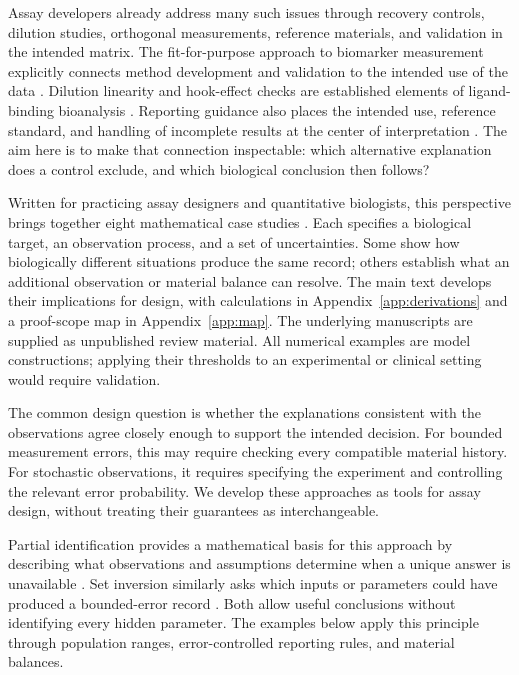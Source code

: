 \documentclass[11pt]{article}
\begin{document}
Assay developers already address many such issues through recovery controls, dilution studies, orthogonal measurements, reference materials, and validation in the intended matrix. The fit-for-purpose approach to biomarker measurement explicitly connects method development and validation to the intended use of the data \citep{lee}. Dilution linearity and hook-effect checks are established elements of ligand-binding bioanalysis \citep{ich}. Reporting guidance also places the intended use, reference standard, and handling of incomplete results at the center of interpretation \citep{stard}. The aim here is to make that connection inspectable: which alternative explanation does a control exclude, and which biological conclusion then follows?

Written for practicing assay designers and quantitative biologists, this perspective brings together eight mathematical case studies \citep{E,I,S,V,C,A,M,R}. Each specifies a biological target, an observation process, and a set of uncertainties. Some show how biologically different situations produce the same record; others establish what an additional observation or material balance can resolve. The main text develops their implications for design, with calculations in Appendix~\ref{app:derivations} and a proof-scope map in Appendix~\ref{app:map}. The underlying manuscripts are supplied as unpublished review material. All numerical examples are model constructions; applying their thresholds to an experimental or clinical setting would require validation.

The common design question is whether the explanations consistent with the observations agree closely enough to support the intended decision. For bounded measurement errors, this may require checking every compatible material history. For stochastic observations, it requires specifying the experiment and controlling the relevant error probability. We develop these approaches as tools for assay design, without treating their guarantees as interchangeable.

Partial identification provides a mathematical basis for this approach by describing what observations and assumptions determine when a unique answer is unavailable \citep{manski}. Set inversion similarly asks which inputs or parameters could have produced a bounded-error record \citep{jaulin}. Both allow useful conclusions without identifying every hidden parameter. The examples below apply this principle through population ranges, error-controlled reporting rules, and material balances.
\end{document}
